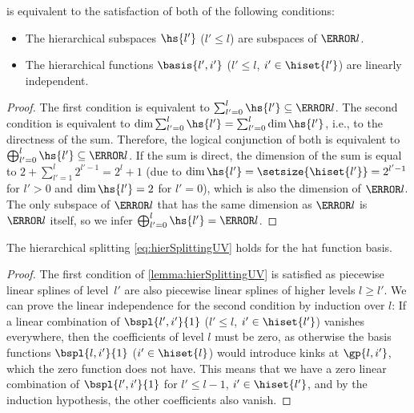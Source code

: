 \begin{lemma}
  \label{lemma:hierSplittingUV}
   is equivalent to the satisfaction of
  both of the following conditions:
  \begin{itemize}
    \item
    The hierarchical subspaces $\hs{l'}$ ($l' \le l$)
    are subspaces of $\ns{l}$.
    
    \item
    The hierarchical functions
    $\basis{l',i'}$ ($l' \le l$, $i' \in \hiset{l'}$)
    are linearly independent.
  \end{itemize}
\end{lemma}
\begin{proof}
  The first condition is equivalent to $\sum_{l'=0}^l \hs{l'} \subset \ns{l}$.
  The second condition is equivalent to
  $\dim \sum_{l'=0}^l \hs{l'} = \sum_{l'=0}^l \dim \hs{l'}$,
  i.e., to the directness of the sum.
  Therefore, the logical conjunction of both is equivalent to
  $\bigoplus_{l'=0}^l \hs{l'} \subset \ns{l}$.
  If the sum is direct,
  the dimension of the sum is equal to $2 + \sum_{l'=1}^l 2^{l'-1} = 2^l + 1$
  (due to $\dim \hs{l'} = \setsize{\hiset{l'}} = 2^{l'-1}$ for $l' > 0$ and
  $\dim \hs{l'} = 2$ for $l' = 0$),
  which is also the dimension of $\ns{l}$.
  The only subspace of $\ns{l}$ that has the same
  dimension as $\ns{l}$ is $\ns{l}$ itself,
  so we infer $\bigoplus_{l'=0}^l \hs{l'} = \ns{l}$.
\end{proof}
\begin{corollary}
  \label{cor:hierSplittingHatUV}
  The hierarchical splitting \eqref{eq:hierSplittingUV}
  holds for the hat function basis.
\end{corollary}
\begin{proof}
  The first condition of \cref{lemma:hierSplittingUV}
  is satisfied as piecewise linear splines of level~$l'$
  are also piecewise linear splines of higher levels $l \ge l'$.
  We can prove the linear independence for the second condition by induction
  over $l$:
  If a linear combination of $\bspl{l',i'}{1}$
  ($l' \le l$, $i' \in \hiset{l'}$)
  vanishes everywhere, then the coefficients of level $l$ must be zero,
  as otherwise the basis functions $\bspl{l,i'}{1}$ ($i' \in \hiset{l}$) would
  introduce kinks at $\gp{l,i'}$, which the zero function does not have.
  This means that we have a zero linear combination of $\bspl{l',i'}{1}$ for
  $l' \le l - 1$, $i' \in \hiset{l'}$,
  and by the induction hypothesis, the other coefficients also vanish.
\end{proof}



